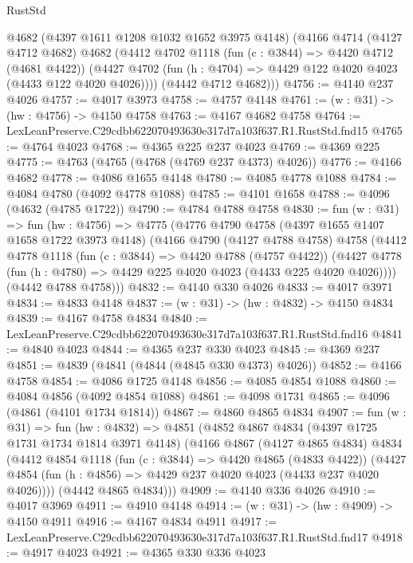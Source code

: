 \begin{lexlean}{RustStd}
\begin{coremodule}
      @4682
      (@4397 @1611 @1208 @1032 @1652 @3975 @4148)
      (@4166
        @4714
        (@4127 @4712 @4682)
        @4682
        (@4412
          @4702
          @1118
          (fun (c : @3844) => @4420 @4712 (@4681 @4422))
          (@4427 @4702 (fun (h : @4704) => @4429 @122 @4020 @4023 (@4433 @122 @4020 @4026))))
        (@4442 @4712 @4682)))
@4756 := @4140 @237 @4026
@4757 := @4017 @3973
@4758 := @4757 @4148
@4761 := (w : @31) -> (hw : @4756) -> @4150 @4758
@4763 := @4167 @4682 @4758
@4764 := LexLeanPreserve.C29cdbb622070493630e317d7a103f637.R1.RustStd.fnd15
@4765 := @4764 @4023
@4768 := @4365 @225 @237 @4023
@4769 := @4369 @225
@4775 := @4763 (@4765 (@4768 (@4769 @237 @4373) @4026))
@4776 := @4166 @4682
@4778 := @4086 @1655 @4148
@4780 := @4085 @4778 @1088
@4784 := @4084 @4780 (@4092 @4778 @1088)
@4785 := @4101 @1658
@4788 := @4096 (@4632 (@4785 @1722))
@4790 := @4784 @4788 @4758
@4830 := fun (w : @31) =>
  fun (hw : @4756) =>
  @4775
    (@4776
      @4790
      @4758
      (@4397 @1655 @1407 @1658 @1722 @3973 @4148)
      (@4166
        @4790
        (@4127 @4788 @4758)
        @4758
        (@4412
          @4778
          @1118
          (fun (c : @3844) => @4420 @4788 (@4757 @4422))
          (@4427 @4778 (fun (h : @4780) => @4429 @225 @4020 @4023 (@4433 @225 @4020 @4026))))
        (@4442 @4788 @4758)))
@4832 := @4140 @330 @4026
@4833 := @4017 @3971
@4834 := @4833 @4148
@4837 := (w : @31) -> (hw : @4832) -> @4150 @4834
@4839 := @4167 @4758 @4834
@4840 := LexLeanPreserve.C29cdbb622070493630e317d7a103f637.R1.RustStd.fnd16
@4841 := @4840 @4023
@4844 := @4365 @237 @330 @4023
@4845 := @4369 @237
@4851 := @4839 (@4841 (@4844 (@4845 @330 @4373) @4026))
@4852 := @4166 @4758
@4854 := @4086 @1725 @4148
@4856 := @4085 @4854 @1088
@4860 := @4084 @4856 (@4092 @4854 @1088)
@4861 := @4098 @1731
@4865 := @4096 (@4861 (@4101 @1734 @1814))
@4867 := @4860 @4865 @4834
@4907 := fun (w : @31) =>
  fun (hw : @4832) =>
  @4851
    (@4852
      @4867
      @4834
      (@4397 @1725 @1731 @1734 @1814 @3971 @4148)
      (@4166
        @4867
        (@4127 @4865 @4834)
        @4834
        (@4412
          @4854
          @1118
          (fun (c : @3844) => @4420 @4865 (@4833 @4422))
          (@4427 @4854 (fun (h : @4856) => @4429 @237 @4020 @4023 (@4433 @237 @4020 @4026))))
        (@4442 @4865 @4834)))
@4909 := @4140 @336 @4026
@4910 := @4017 @3969
@4911 := @4910 @4148
@4914 := (w : @31) -> (hw : @4909) -> @4150 @4911
@4916 := @4167 @4834 @4911
@4917 := LexLeanPreserve.C29cdbb622070493630e317d7a103f637.R1.RustStd.fnd17
@4918 := @4917 @4023
@4921 := @4365 @330 @336 @4023

\end{coremodule}
\end{lexlean}
